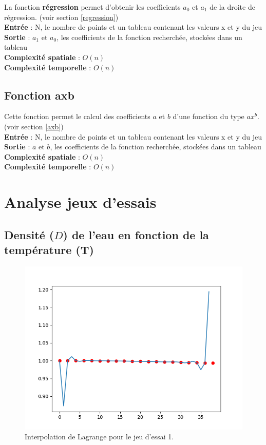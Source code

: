 \documentclass[12pt,french,titlepage]{article}
\begin{document}
	La fonction \textbf{régression} permet d'obtenir les coefficients $a_0$ et $a_1$ de  la droite de régression. (voir section \ref{regression})\\
	
	\textbf{Entrée} : N, le nombre de points et un tableau contenant les valeurs x et y du jeu\\
	\textbf{Sortie} : $a_1$ et $a_0$, les coefficients de la fonction recherchée, stockées dans un tableau\\
	\textbf{Complexité spatiale} : $O(n)$\\
	\textbf{Complexité temporelle} : $O(n) $\\
	
	\subsection{Fonction axb}
	
	\medskip
	Cette fonction permet le calcul des coefficients $a$ et $b$ d'une fonction du type $ax^b$. (voir section \ref{axb})\\
	
	\textbf{Entrée} : N, le nombre de points et un tableau contenant les valeurs x et y du jeu\\
	\textbf{Sortie} : $a$ et $b$, les coefficients de la fonction recherchée, stockées dans un tableau\\
	\textbf{Complexité spatiale} : $O(n)$\\
	\textbf{Complexité temporelle} : $O(n) $\\
	
	\section{Analyse jeux d'essais}
	
	\subsection{Densité ($D$) de l'eau en fonction de la température (T)}
		\begin{figure}[H]
		\includegraphics[width=\textwidth]{"11.png"}
		\caption{Interpolation de Lagrange pour le jeu d'essai 1.}
		\end{figure}
		
\end{document}
